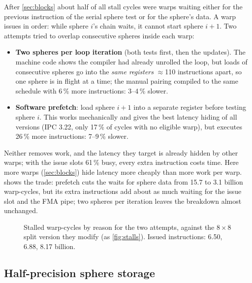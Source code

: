 \documentclass[11pt,a4paper]{article}
\newcommand{\stallbars}[1]{%
  \addplot[fill=blue!65,   draw=black!40] table[col sep=comma, x=long_scoreboard_gcycles,    y expr=\coordindex] {#1};
  \addplot[fill=cyan!45,   draw=black!40] table[col sep=comma, x=wait_gcycles,               y expr=\coordindex] {#1};
  \addplot[fill=orange!75, draw=black!40] table[col sep=comma, x=not_selected_gcycles,       y expr=\coordindex] {#1};
  \addplot[fill=red!65,    draw=black!40] table[col sep=comma, x=math_pipe_throttle_gcycles, y expr=\coordindex] {#1};
  \addplot[fill=violet!60, draw=black!40] table[col sep=comma, x=lg_throttle_gcycles,        y expr=\coordindex] {#1};
  \addplot[fill=teal!55,   draw=black!40] table[col sep=comma, x=branch_resolving_gcycles,   y expr=\coordindex] {#1};
  \addplot[fill=brown!50,  draw=black!40] table[col sep=comma, x=no_instruction_gcycles,     y expr=\coordindex] {#1};
  \addplot[fill=gray!30,   draw=black!40] table[col sep=comma, x=other_gcycles,              y expr=\coordindex] {#1};
  \legend{data (long scoreboard), dependency (wait), not selected, FMA pipe (math throttle),
          load queue (lg throttle), branch, instruction fetch, other}}
\begin{document}
After \cref{sec:blocks} about half of all stall cycles were warps waiting either for the previous
instruction of the serial sphere test or for the sphere's data. A warp issues in order: while sphere
$i$'s chain waits, it cannot start sphere $i+1$. Two attempts tried to overlap consecutive spheres
inside each warp:
\begin{itemize}[nosep]
  \item \textbf{Two spheres per loop iteration} (both tests first, then the updates). The machine code
        shows the compiler had already unrolled the loop, but loads of consecutive spheres go into the
        \emph{same registers} $\approx$110 instructions apart, so one sphere is in flight at a time;
        the manual pairing compiled to the same schedule with 6\,\% more instructions:
        3--4\,\% slower.
  \item \textbf{Software prefetch}: load sphere $i+1$ into a separate register before testing sphere
        $i$. This works mechanically and gives the best latency hiding of all versions (IPC 3.22,
        only 17\,\% of cycles with no eligible warp), but executes 26\,\% more instructions:
        7--9\,\% slower.
\end{itemize}
Neither removes work, and the latency they target is already hidden by other warps; with the issue
slots 61\,\% busy, every extra instruction costs time. Here more warps (\cref{sec:blocks}) hide
latency more cheaply than more work per warp.  shows the trade: prefetch
cuts the waits for sphere data from 15.7 to 3.1 billion warp-cycles, but its extra instructions add
about as much waiting for the issue slot and the FMA pipe; two spheres per iteration leaves the
breakdown almost unchanged.

\begin{figure}[h]
  \centering
  \caption{Stalled warp-cycles by reason for the two attempts, against the $8 \times 8$ split
    version they modify (as \cref{fig:stalls}). Issued instructions: 6.50, 6.88, 8.17 billion.}
  \label{fig:stalls_failed}
\end{figure}

\subsection{Half-precision sphere storage}
\label{sec:fp16}
\end{document}
